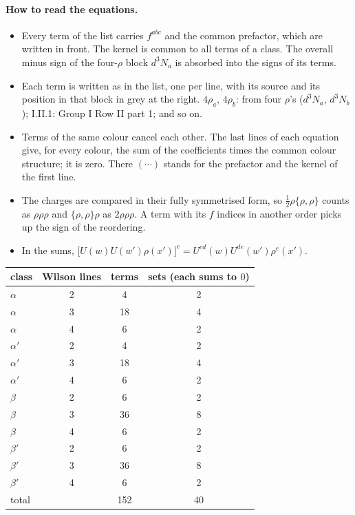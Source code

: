 \documentclass[10pt]{article}
\begin{document}
\paragraph{How to read the equations.}
\begin{itemize}
\item Every term of the list carries $f^{abc}$ and the common prefactor, which are written in front. The kernel is common to all terms of a class. The overall minus sign of the four-$\rho$ block $d^3N_a$ is absorbed into the signs of its terms.
\item Each term is written as in the list, one per line, with its source and its position in that block in grey at the right. $4\rho_a$, $4\rho_b$: from four $\rho$'s ($d^3N_a$, $d^3N_b$); I.II.1: Group I Row II part 1; and so on.
\item Terms of the same colour cancel each other. The last lines of each equation give, for every colour, the sum of the coefficients times the common colour structure; it is zero. There $(\cdots)$ stands for the prefactor and the kernel of the first line.
\item The charges are compared in their fully symmetrised form, so $\tfrac12\rho\{\rho,\rho\}$ counts as $\rho\rho\rho$ and $\{\rho,\rho\}\rho$ as $2\rho\rho\rho$. A term with its $f$ indices in another order picks up the sign of the reordering.
\item In the sums, $\big[U(w)U(w')\rho(x')\big]^c=U^{cd}(w)U^{de}(w')\rho^e(x')$.
\end{itemize}

\begin{center}\begin{tabular}{lccc}\toprule
class & Wilson lines & terms & sets (each sums to $0$)\\\midrule
$\alpha$ & 2 & 4 & 2\\
$\alpha$ & 3 & 18 & 4\\
$\alpha$ & 4 & 6 & 2\\
\midrule
$\alpha'$ & 2 & 4 & 2\\
$\alpha'$ & 3 & 18 & 4\\
$\alpha'$ & 4 & 6 & 2\\
\midrule
$\beta$ & 2 & 6 & 2\\
$\beta$ & 3 & 36 & 8\\
$\beta$ & 4 & 6 & 2\\
\midrule
$\beta'$ & 2 & 6 & 2\\
$\beta'$ & 3 & 36 & 8\\
$\beta'$ & 4 & 6 & 2\\
\midrule
total & & 152 & 40\\\bottomrule\end{tabular}\end{center}
\end{document}
